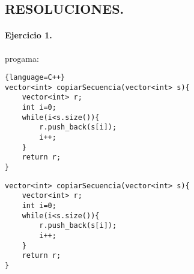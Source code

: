 \documentclass{article}
\begin{document}


\begin{center}
\section*{RESOLUCIONES.}
\end{center}
\paragraph{Ejercicio 1.}progama:

\begin{lstlisting}{language=C++}
vector<int> copiarSecuencia(vector<int> s){
	vector<int> r;
	int i=0;
	while(i<s.size()){
		r.push_back(s[i]);
		i++;	
	}
	return r;
}
\end{lstlisting}
\begin{verbatim}
vector<int> copiarSecuencia(vector<int> s){
	vector<int> r;
	int i=0;
	while(i<s.size()){
		r.push_back(s[i]);
		i++;	
	}
	return r;
}
\end{verbatim}
\end{document}
